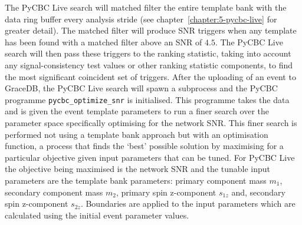 The PyCBC Live search will matched filter the entire template bank with the data ring buffer every analysis stride (see chapter~\ref{chapter:5-pycbc-live} for greater detail). The matched filter will produce SNR triggers when any template has been found with a matched filter above an SNR of $4.5$. The PyCBC Live search will then pass these triggers to the ranking statistic, taking into account any signal-consistency test values or other ranking statistic components, to find the most significant coincident set of triggers. After the uploading of an event to GraceDB, the PyCBC Live search will spawn a subprocess and the PyCBC programme \texttt{pycbc\_optimize\_snr} is initialised. This programme takes the \gwadj data and is given the event template parameters to run a finer search over the parameter space specifically optimising for the network SNR. This finer search is performed not using a template bank approach but with an optimisation function, a process that finds the `best' possible solution by maximising for a particular objective given input parameters that can be tuned. For PyCBC Live the objective being maximised is the network SNR and the tunable input parameters are the template bank parameters: primary component mass $m_{1}$, secondary component mass $m_{2}$, primary spin z-component $s_{1z}$ and, secondary spin z-component $s_{2z}$. Boundaries are applied to the input parameters which are calculated using the initial event parameter values.

